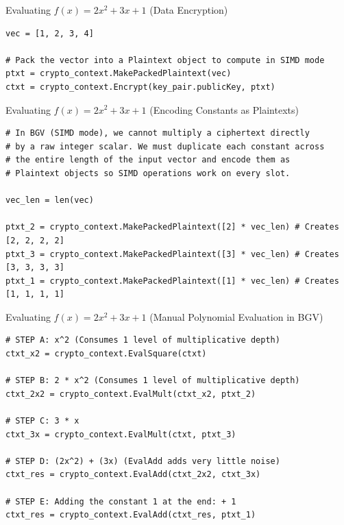 \documentclass[aspectratio=169, 10pt]{beamer}
\begin{document}
\begin{frame}[fragile]{Evaluating $f(x) = 2x^2 + 3x + 1$ (Data Encryption)}
\vspace{0.1cm}
\begin{lstlisting}[firstnumber=31]
vec = [1, 2, 3, 4]
    
# Pack the vector into a Plaintext object to compute in SIMD mode
ptxt = crypto_context.MakePackedPlaintext(vec)
ctxt = crypto_context.Encrypt(key_pair.publicKey, ptxt)
\end{lstlisting}
\end{frame}

\begin{frame}[fragile]{Evaluating $f(x) = 2x^2 + 3x + 1$ (Encoding Constants as Plaintexts)}
\vspace{0.1cm}
\begin{lstlisting}[firstnumber=36]
# In BGV (SIMD mode), we cannot multiply a ciphertext directly 
# by a raw integer scalar. We must duplicate each constant across 
# the entire length of the input vector and encode them as 
# Plaintext objects so SIMD operations work on every slot.
    
vec_len = len(vec)
    
ptxt_2 = crypto_context.MakePackedPlaintext([2] * vec_len) # Creates [2, 2, 2, 2]
ptxt_3 = crypto_context.MakePackedPlaintext([3] * vec_len) # Creates [3, 3, 3, 3]
ptxt_1 = crypto_context.MakePackedPlaintext([1] * vec_len) # Creates [1, 1, 1, 1]
\end{lstlisting}
\end{frame}

\begin{frame}[fragile]{Evaluating $f(x) = 2x^2 + 3x + 1$ (Manual Polynomial Evaluation in BGV)}
\vspace{0.1cm}
\begin{lstlisting}[firstnumber=46]
# STEP A: x^2 (Consumes 1 level of multiplicative depth)
ctxt_x2 = crypto_context.EvalSquare(ctxt)
    
# STEP B: 2 * x^2 (Consumes 1 level of multiplicative depth)
ctxt_2x2 = crypto_context.EvalMult(ctxt_x2, ptxt_2)
    
# STEP C: 3 * x
ctxt_3x = crypto_context.EvalMult(ctxt, ptxt_3)
    
# STEP D: (2x^2) + (3x) (EvalAdd adds very little noise)
ctxt_res = crypto_context.EvalAdd(ctxt_2x2, ctxt_3x)
    
# STEP E: Adding the constant 1 at the end: + 1
ctxt_res = crypto_context.EvalAdd(ctxt_res, ptxt_1)
\end{lstlisting}
\end{frame}
\end{document}
